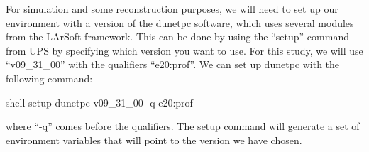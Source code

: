 \documentclass[8pt]{refart}
\begin{document}
 For simulation and some reconstruction purposes, we will need to set up our environment with a version of the \href{https://github.com/DUNE/dunetpc}{dunetpc} software, which uses several modules from the LArSoft framework.  This can be done by using the ``setup'' command from UPS by specifying which version you want to use.  For this study, we will use ``v09\_31\_00'' with the qualifiers ``e20:prof''.  We can set up dunetpc with the following command:
\begin{code}{shell}
setup dunetpc v09_31_00 -q e20:prof
\end{code}
where ``-q'' comes before the qualifiers.  The setup command will generate a set of environment variables that will point to the version we have chosen.  
\end{document}
